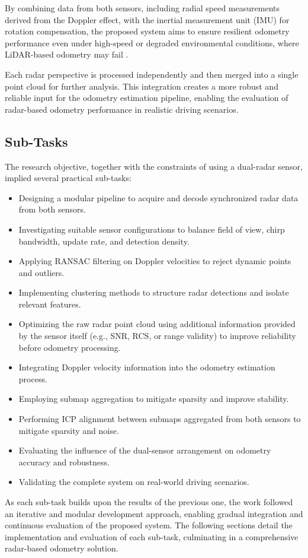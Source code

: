 By combining data from both sensors, including radial speed measurements derived from the Doppler effect, with the inertial measurement unit (IMU) for rotation compensation, the proposed system aims to ensure resilient odometry performance even under high-speed or degraded environmental conditions, where LiDAR-based odometry may fail \cite{HighSpeed_Estimation}.

Each radar perspective is processed independently and then merged into a single point cloud for further analysis.
This integration creates a more robust and reliable input for the odometry estimation pipeline, enabling the evaluation of radar-based odometry performance in realistic driving scenarios.

\subsection{Sub-Tasks}

The research objective, together with the constraints of using a dual-radar sensor, implied several practical sub-tasks:  
\begin{itemize}
    \item Designing a modular pipeline to acquire and decode synchronized radar data from both sensors.
    \item Investigating suitable sensor configurations to balance field of view, chirp bandwidth, update rate, and detection density.  
    \item Applying RANSAC filtering on Doppler velocities to reject dynamic points and outliers.
    \item Implementing clustering methods to structure radar detections and isolate relevant features.  
    \item Optimizing the raw radar point cloud using additional information provided by the sensor itself (e.g., SNR, RCS, or range validity) to improve reliability before odometry processing.  
    \item Integrating Doppler velocity information into the odometry estimation process.   
    \item Employing submap aggregation to mitigate sparsity and improve stability. 
    \item Performing ICP alignment between submaps aggregated from both sensors to mitigate sparsity and noise. 
    \item Evaluating the influence of the dual-sensor arrangement on odometry accuracy and robustness. 
    \item Validating the complete system on real-world driving scenarios. 
\end{itemize}

As each sub-task builds upon the results of the previous one, the work followed an iterative and modular development approach, enabling gradual integration and continuous evaluation of the proposed system.  
The following sections detail the implementation and evaluation of each sub-task, culminating in a comprehensive radar-based odometry solution.